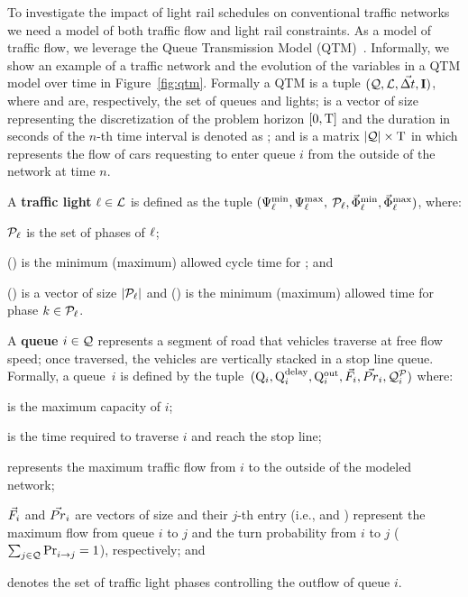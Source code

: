 To investigate the impact of light rail schedules on conventional
traffic networks we need a model of both traffic flow and light rail
constraints.  As a model of traffic flow, we leverage the Queue
Transmission Model (QTM)~\cite{guilliard2016trb}.  Informally, we show an example of a traffic
network and the evolution of the variables in a QTM model over time
in Figure~\ref{fig:qtm}.  Formally a QTM is a tuple $(\mathcal{Q}, \mathcal{L},
\vec{\Delta t}, \mathbf{I})$, where \Qset and \Lset are, respectively, the set of
queues and lights;
%
\vecDT is a vector of size \Nn representing the discretization of the problem
horizon $[0,\mathrm{T}]$ and the duration in seconds of the $n$-th
time interval is denoted as \DT[n];
%
%
and \MatQIN is a matrix $|\mathcal{Q}| \times \mathrm{T}$ in which  represents
the flow of cars requesting to enter queue $i$ from the outside of the network
at time $n$.

\parskip=0pt
A \textbf{traffic light} $\ell \in \mathcal{L}$ is defined as the tuple $(\mathrm{\Psi}_{\ell}^{\mathrm{min}},
\mathrm{\Psi}_{\ell}^{\mathrm{max}},$ $\mathcal{P}_\ell, \vec{\mathrm{\Phi}}_{\ell}^{\mathrm{min}}, \vec{\mathrm{\Phi}}_{\ell}^{\mathrm{max}})$, where:
%
\begin{itemize*}[label={}]
%
\item $\mathcal{P}_\ell$ is the set of phases of $\ell$;
%
\item \CTMIN{\tl} (\CTMAX{\tl}) is the minimum (maximum) allowed cycle time for
\tl; and
%
\item \VecPTMIN{\tl} (\VecPTMAX{\tl}) is a vector of size $|\mathcal{P}_\ell|$ and
   () is the minimum (maximum) allowed time for
  phase $k \in \mathcal{P}_\ell$. 
%
\end{itemize*}


A \textbf{queue} $i \in \mathcal{Q}$ represents a segment of road that vehicles
traverse at free flow speed; once traversed, the vehicles are vertically stacked
in a stop line queue.
%
Formally, a queue~$i$ is defined by the tuple~$(\mathrm{Q}_{i}, \mathrm{Q}_{i}^{\mathrm{delay}}, \mathrm{Q}_{i}^{\mathrm{out}},
\vec{F}_i, \vec{Pr}_i, \mathcal{Q}_{i}^{\mathcal{P}})$ where:
%
\begin{itemize*}[label={}]
%
\item {} is the maximum capacity of $i$;
%
\item {} is the time required to traverse $i$ and reach the stop line;
%
\item {} represents the maximum traffic flow from $i$ to the outside of
  the modeled network;
%
\item $\vec{F}_i$ and $\vec{Pr}_i$ are vectors of size \Qn and their $j$-th entry
  (i.e.,  and ) represent the maximum flow from queue $i$
  to $j$ and the turn probability from $i$ to $j$ ($\sum_{j \in
  \mathcal{Q}}\mathrm{Pr}_{i\to j}^{\mathrm{}} = 1$), respectively; and
%
\item {} denotes the set of traffic light phases controlling the outflow
  of queue $i$.
%
\end{itemize*}

